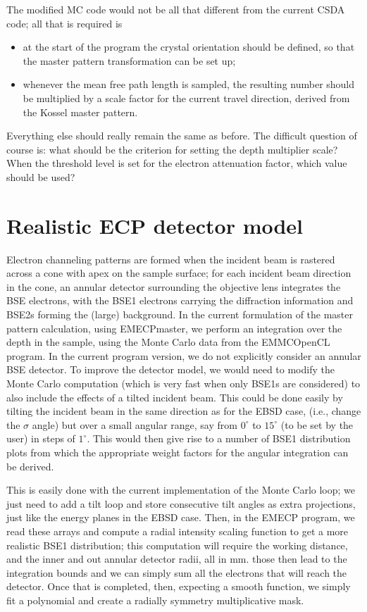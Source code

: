\documentclass[DIV=calc, paper=letter, fontsize=11pt]{scrartcl}	 %
\begin{document}
The modified MC code would not be all that different from the current CSDA code; all that is required is 
\begin{itemize}
\item at the start of the program the crystal orientation should be defined, so that the master pattern transformation can be set up;
\item whenever the mean free path length is sampled, the resulting number should be multiplied by a scale factor for the current travel direction, derived from the Kossel master pattern.
\end{itemize}
Everything else should really remain the same as before.  The difficult question of course is: what should be the criterion for setting the depth multiplier scale? When the 
threshold level is set for the electron attenuation factor, which value should be used?  

\newpage

\section{Realistic ECP detector model}
Electron channeling patterns are formed when the incident beam is rastered across a cone with apex on the sample surface;
for each incident beam direction in the cone, an annular detector surrounding the objective lens integrates the BSE electrons, with the 
BSE1 electrons carrying the diffraction information and BSE2s forming the (large) background.  In the current formulation of the master 
pattern calculation, using \textsf{EMECPmaster}, we perform an integration over the depth in the sample, using the Monte Carlo data 
from the \textsf{EMMCOpenCL} program.  In the current program version, we do not explicitly consider an annular BSE detector.  To improve the
detector model, we would need to modify the Monte Carlo computation (which is very fast when only BSE1s are considered) to also include
the effects of a tilted incident beam.  This could be done easily by tilting the incident beam in the same direction as for the EBSD case, (i.e., change the $\sigma$ angle) but over a 
small angular range, say from $0^{\circ}$ to $15^{\circ}$ (to be set by the user) in steps of $1^{\circ}$.  This would then give rise to a number of BSE1 distribution plots
from which the appropriate weight factors for the angular integration can be derived.

This is easily done with the current implementation of the Monte Carlo loop; we just need to add a tilt loop and store consecutive
tilt angles as extra projections, just like the energy planes in the EBSD case.  Then, in the \textsf{EMECP} program, we read 
these arrays and compute a radial intensity scaling function to get a more realistic BSE1 distribution; this computation will
require the working distance, and the inner and out annular detector radii, all in mm.  those then lead to the integration bounds
and we can simply sum all the electrons that will reach the detector.  Once that is completed, then, expecting a smooth function, we
simply fit a polynomial and create a radially symmetry multiplicative mask.
\end{document}
